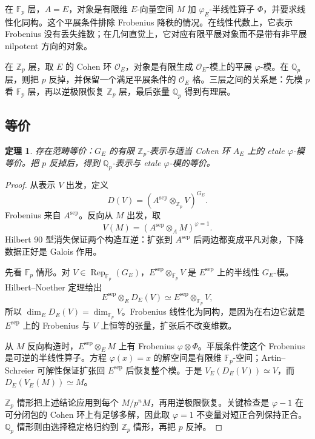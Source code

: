 \documentclass[11pt,a4paper,openany]{ctexbook}
\numberwithin{equation}{chapter}
\newcommand{\Q}{\mathbb{Q}}
\newcommand{\Z}{\mathbb{Z}}
\newcommand{\F}{\mathbb{F}}
\theoremstyle{plain}
\newtheorem{theorem}{定理}[chapter]
\theoremstyle{definition}
\theoremstyle{remark}
\begin{document}
在 $\F_p$ 层，$A=E$，对象是有限维 $E$-向量空间 $M$ 加 $\varphi_E$-半线性算子 $\Phi$，并要求线性化同构。这个平展条件排除 Frobenius 降秩的情况。在线性代数上，它表示 Frobenius 没有丢失维数；在几何直觉上，它对应有限平展对象而不是带有非平展 nilpotent 方向的对象。

在 $\Z_p$ 层，取 $E$ 的 Cohen 环 $\mathcal O_E$，对象是有限生成 $\mathcal O_E$-模上的平展 $\varphi$-模。在 $\Q_p$ 层，则把 $p$ 反掉，并保留一个满足平展条件的 $\mathcal O_E$ 格。三层之间的关系是：先模 $p$ 看 $\F_p$ 层，再以逆极限恢复 $\Z_p$ 层，最后张量 $\Q_p$ 得到有理层。

\subsection{等价}

\begin{theorem}
存在范畴等价：$G_E$ 的有限 $\Z_p$-表示与适当 Cohen 环 $A_E$ 上的 etale $\varphi$-模等价。把 $p$ 反掉后，得到 $\Q_p$-表示与 etale $\varphi$-模的等价。
\end{theorem}

\begin{proof}
从表示 $V$ 出发，定义
\[
  D(V)=(A^{\mathrm{sep}}\otimes_{\Z_p}V)^{G_E}.
\]
Frobenius 来自 $A^{\mathrm{sep}}$。反向从 $M$ 出发，取
\[
  V(M)=(A^{\mathrm{sep}}\otimes_A M)^{\varphi=1}.
\]
Hilbert 90 型消失保证两个构造互逆：扩张到 $A^{\mathrm{sep}}$ 后两边都变成平凡对象，下降数据正好是 Galois 作用。

先看 $\F_p$ 情形。对 $V\in\operatorname{Rep}_{\F_p}(G_E)$，$E^{\mathrm{sep}}\otimes_{\F_p}V$ 是 $E^{\mathrm{sep}}$ 上的半线性 $G_E$-模。Hilbert--Noether 定理给出
\[
  E^{\mathrm{sep}}\otimes_E D_E(V)\simeq E^{\mathrm{sep}}\otimes_{\F_p}V,
\]
所以 $\dim_E D_E(V)=\dim_{\F_p}V$。Frobenius 线性化为同构，是因为在右边它就是 $E^{\mathrm{sep}}$ 上的 Frobenius 与 $V$ 上恒等的张量，扩张后不改变维数。

从 $M$ 反向构造时，$E^{\mathrm{sep}}\otimes_E M$ 上有 Frobenius $\varphi\otimes\Phi$。平展条件使这个 Frobenius 是可逆的半线性算子。方程 $\varphi(x)=x$ 的解空间是有限维 $\F_p$-空间；Artin--Schreier 可解性保证扩张回 $E^{\mathrm{sep}}$ 后恢复整个模。于是 $V_E(D_E(V))\simeq V$，而 $D_E(V_E(M))\simeq M$。

$\Z_p$ 情形把上述结论应用到每个 $M/p^nM$，再用逆极限恢复。关键检查是 $\varphi-1$ 在可分闭包的 Cohen 环上有足够多解，因此取 $\varphi=1$ 不变量对短正合列保持正合。$\Q_p$ 情形则由选择稳定格归约到 $\Z_p$ 情形，再把 $p$ 反掉。
\end{proof}
\end{document}
